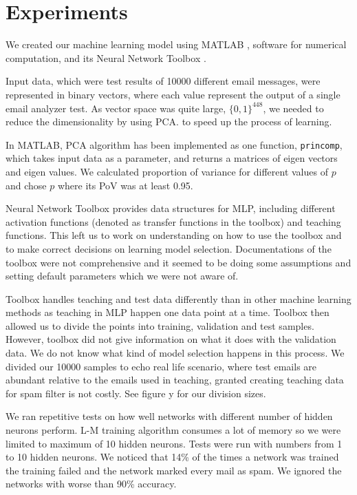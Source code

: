 \section{Experiments}

We created our machine learning model using MATLAB    , software for numerical computation, and its Neural Network Toolbox  \cite{matlab:nn} .

Input data, which were test results of 10000 different email messages, were represented in  binary vectors, where each value represent the output of a single email analyzer test. As vector space was quite large, $\{0,1\}^{448}$, we needed to reduce the dimensionality by using PCA. to speed up the process of learning.

In MATLAB, PCA algorithm has been implemented as one function, \verb!princomp!, which takes input data as a parameter, and returns a matrices of eigen vectors and eigen values. We calculated proportion of variance for different values of $p$ and chose $p$ where its PoV was at least 0.95.

Neural Network Toolbox provides data structures for MLP, including different activation functions (denoted as transfer functions in the toolbox) and teaching functions. This left us to work on understanding on how to use the toolbox and to make correct decisions on learning model selection. Documentations of the toolbox were not comprehensive and it seemed to be doing some assumptions and setting default parameters which we were not aware of.

Toolbox handles teaching and test data differently than in other machine learning methods as teaching in MLP happen one data point at a time. Toolbox then allowed us to divide the points into training, validation and test samples. However, toolbox did not give information on what it does with the validation data. We do not know what kind of model selection happens in this process. We divided our 10000 samples to echo real life scenario, where test emails are abundant relative to the emails used in teaching, granted creating teaching data for spam filter is not costly. See figure y for our division sizes.

We ran repetitive tests on how well networks with different number of hidden neurons perform. L-M training algorithm consumes a lot of memory so we were limited to maximum of 10 hidden neurons. Tests were run with numbers from 1 to 10 hidden neurons. We noticed that 14\% of the times a network was trained the training failed and the network marked every mail as spam. We ignored the networks with worse than 90\% accuracy.


